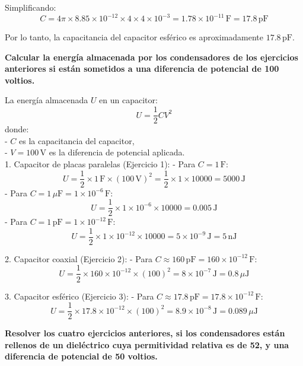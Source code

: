 \documentclass[answers]{exam} %
\begin{document}
\begin{questions}
        Simplificando:
        \[
        C = 4 \pi \times 8.85 \times 10^{-12} \times 4 \times 4 \times 10^{-3} = 1.78 \times 10^{-11} \, \text{F} = 17.8 \, \text{pF}
        \]
        
        Por lo tanto, la capacitancia del capacitor esférico es aproximadamente \( 17.8 \, \text{pF} \).
      
        
     \vspace{0.5cm}
    \question \large\textbf{Calcular la energía almacenada por los condensadores de los ejercicios anteriores si están sometidos a una diferencia de potencial de 100 voltios.}

  
        La energía almacenada \( U \) en un capacitor:
        \[
        \boxed{U = \frac{1}{2} C V^2}
        \]
        donde:\\
        - \( C \) es la capacitancia del capacitor,\\
        - \( V = 100 \, \text{V} \) es la diferencia de potencial aplicada.\\
        
        1. Capacitor de placas paralelas (Ejercicio 1):
           - Para \( C = 1 \, \text{F} \):
             \[
             U = \frac{1}{2} \times 1 \, \text{F} \times (100 \, \text{V})^2 = \frac{1}{2} \times 1 \times 10000 = 5000 \, \text{J}
             \]
           - Para \( C = 1 \, \mu \text{F} = 1 \times 10^{-6} \, \text{F} \):
             \[
             U = \frac{1}{2} \times 1 \times 10^{-6} \times 10000 = 0.005 \, \text{J}
             \]
           - Para \( C = 1 \, \text{pF} = 1 \times 10^{-12} \, \text{F} \):
             \[
             U = \frac{1}{2} \times 1 \times 10^{-12} \times 10000 = 5 \times 10^{-9} \, \text{J} = 5 \, \text{nJ}
             \]
        
        2. Capacitor coaxial (Ejercicio 2):
           - Para \( C \approx 160 \, \text{pF} = 160 \times 10^{-12} \, \text{F} \):
             \[
             U = \frac{1}{2} \times 160 \times 10^{-12} \times (100)^2 = 8 \times 10^{-7} \, \text{J} = 0.8 \, \mu \text{J}
             \]
        
        3. Capacitor esférico (Ejercicio 3):
           - Para \( C \approx 17.8 \, \text{pF} = 17.8 \times 10^{-12} \, \text{F} \):
             \[
             U = \frac{1}{2} \times 17.8 \times 10^{-12} \times (100)^2 = 8.9 \times 10^{-8} \, \text{J} = 0.089 \, \mu \text{J}
             \]
        
        

     \vspace{0.5cm}
    \question \large\textbf{Resolver los cuatro ejercicios anteriores, si los condensadores están rellenos de un dieléctrico cuya permitividad relativa es de 52, y una diferencia de potencial de 50
    voltios.}
    

\end{questions}
\end{document}
